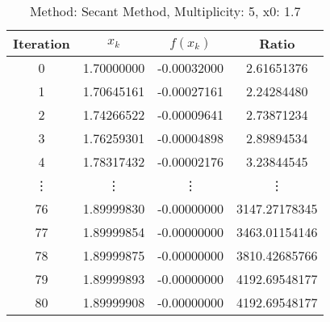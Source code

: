 \begin{table}
\centering
\caption{Method: Secant Method, Multiplicity: 5, x0: 1.7}
\label{tab:table_Secant_Method_5_1_7}
\begin{tabular}{c c c c}
\toprule
Iteration &      $x_k$ &    $f(x_k)$ &         Ratio \\
\midrule
        0 & 1.70000000 & -0.00032000 &    2.61651376 \\
        1 & 1.70645161 & -0.00027161 &    2.24284480 \\
        2 & 1.74266522 & -0.00009641 &    2.73871234 \\
        3 & 1.76259301 & -0.00004898 &    2.89894534 \\
        4 & 1.78317432 & -0.00002176 &    3.23844545 \\
   \vdots &     \vdots &      \vdots &        \vdots \\
       76 & 1.89999830 & -0.00000000 & 3147.27178345 \\
       77 & 1.89999854 & -0.00000000 & 3463.01154146 \\
       78 & 1.89999875 & -0.00000000 & 3810.42685766 \\
       79 & 1.89999893 & -0.00000000 & 4192.69548177 \\
       80 & 1.89999908 & -0.00000000 & 4192.69548177 \\
\bottomrule
\end{tabular}
\end{table}
